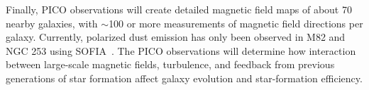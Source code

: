 \documentclass[PICOReport.tex]{subfiles}
\begin{document}
Finally, PICO observations will create detailed magnetic field maps of about 70 nearby galaxies, with $\sim$100 or more measurements of magnetic field directions per galaxy. Currently, polarized dust emission has only been observed in M82 and NGC 253 using SOFIA~\citep{Jonesetal}. The PICO observations will determine how interaction between large-scale magnetic fields, turbulence, and feedback from previous generations of star formation affect galaxy evolution and star-formation efficiency.
\end{document}
